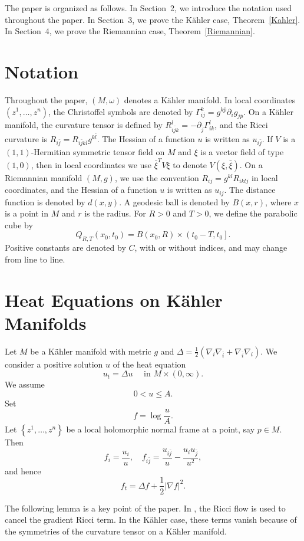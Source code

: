 \documentclass{amsart}
\theoremstyle{definition}
\theoremstyle{remark}
\numberwithin{equation}{section}
\begin{document}
The paper is organized as follows. In Section~2, we introduce the notation used throughout the paper. In Section~3, we prove the K\"ahler case, Theorem~\ref{Kahler}. In Section~4, we prove the Riemannian case, Theorem~\ref{Riemannian}.

\section{Notation} 
Throughout the paper, $(M, \omega)$ denotes a K\"ahler manifold. In local coordinates $(z^1, \ldots, z^n)$, the Christoffel symbols are denoted by $\Gamma_{ij}^{k}=g^{k\bar{p}}\partial_i{g_{j\bar{p}}}$. On a K\"ahler manifold, the curvature tensor is defined by $R_{i \bar{j}k}^l =-\partial_{\bar{j}} \Gamma_{i k}^l$, and the Ricci curvature is $R_{i \bar{j}}=R_{i \bar{j} k \bar{l}} g^{k \bar{l}}$. The Hessian of a function $u$ is written as $u_{i \bar{j}}$. If $V$ is a $(1,1)$-Hermitian symmetric tensor field on $M$ and $\xi$ is a vector field of type $(1,0)$, then in local coordinates we use $\bar{\xi}^T V \xi$ to denote $V(\xi, \bar{\xi})$.
On a Riemannian manifold $(M,g)$, we use the convention $R_{ij}=g^{kl}R_{iklj}$ in local coordinates, and the Hessian of a function $u$ is written as $u_{ij}$.
The distance function is denoted by $d(x,y)$. A geodesic ball is denoted by $B(x, r)$, where $x$ is a point in $M$ and $r$ is the radius. For $R>0$ and $T>0$, we define the parabolic cube by
\[
Q_{R, T}\left(x_0, t_0\right)=B\left(x_0, R\right) \times\left(t_0-T, t_0\right] .
\]
Positive constants are denoted by $C$, with or without indices, and may change from line to line.


\section{Heat Equations on K\"ahler Manifolds}

Let $M$ be a K\"ahler manifold with metric $g$ and $\Delta=\frac{1}{2}(\nabla_{i}\nabla_{\bar{i}}+\nabla_{\bar{i}}\nabla_{i})$. We consider a positive solution $u$ of the heat equation
\[
u_t=\Delta u \quad \text { in } M \times(0, \infty) .
\]
We assume
\[
0<u \leq A .
\]
Set
\[
f=\log \frac{u}{A} .
\]
Let $\left\{z^1, \ldots, z^n\right\}$ be a local holomorphic normal frame at a point, say $p \in M$. Then
\[
f_i=\frac{u_i}{u}, \quad f_{i \bar{j}}=\frac{u_{i \bar{j}}}{u}-\frac{u_i u_{\bar{j}}}{u^2},
\]
and hence
\[
f_t=\Delta f+\frac{1}{2}|\nabla f|^2 .
\]

The following lemma is a key point of the paper. In \cite{Han-Zhang}, the Ricci flow is used to cancel the gradient Ricci term. In the K\"ahler case, these terms vanish because of the symmetries of the curvature tensor on a K\"ahler manifold.
\end{document}
